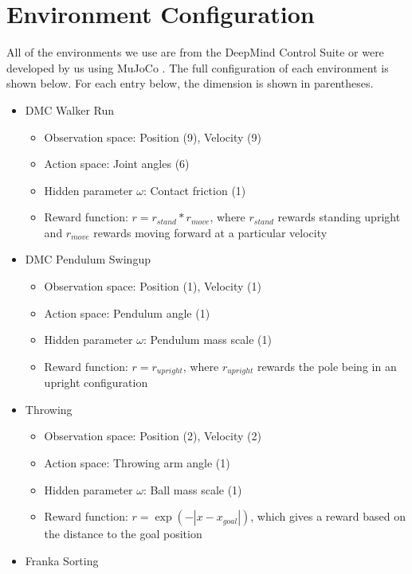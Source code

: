 \appendix
\section{Environment Configuration} \label{section:environment}
All of the environments we use are from the DeepMind Control Suite \cite{Tassa2018} or were developed by us using MuJoCo \cite{Todorov2012}. The full configuration of each environment is shown below. For each entry below, the dimension is shown in parentheses.
\begin{itemize}
    \item DMC Walker Run
    \begin{itemize}
        \item Observation space: Position (9), Velocity (9)
        \item Action space: Joint angles (6)
        \item Hidden parameter $\omega$: Contact friction (1)
        \item Reward function: $r = r_{stand} * r_{move}$, where $r_{stand}$ rewards standing upright and $r_{move}$ rewards moving forward at a particular velocity
    \end{itemize}
    \item DMC Pendulum Swingup
    \begin{itemize}
        \item Observation space: Position (1), Velocity (1)
        \item Action space: Pendulum angle (1)
        \item Hidden parameter $\omega$: Pendulum mass scale (1)
        \item Reward function: $r = r_{upright}$, where $r_{upright}$ rewards the pole being in an upright configuration
    \end{itemize}
    \item Throwing
    \begin{itemize}
        \item Observation space: Position (2), Velocity (2)
        \item Action space: Throwing arm angle (1)
        \item Hidden parameter $\omega$: Ball mass scale (1)
        \item Reward function: $r = \exp{(-|x-x_{goal}|)}$, which gives a reward based on the distance to the goal position
    \end{itemize}
    \item Franka Sorting
    \begin{itemize}

\end{itemize}
\end{itemize}
